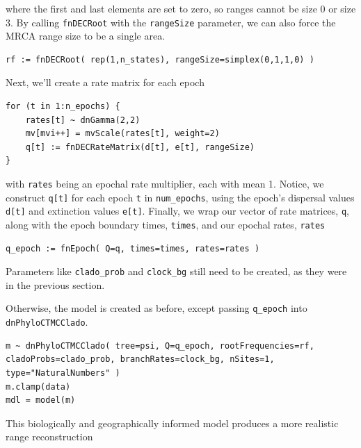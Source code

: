 where the first and last elements are set to zero, so ranges cannot be size 0 or size 3.
By calling {\tt fnDECRoot} with the {\tt rangeSize} parameter, we can also force the MRCA range size to be a single area.

\begin{snugshade}
\begin{lstlisting}
rf := fnDECRoot( rep(1,n_states), rangeSize=simplex(0,1,1,0) )
\end{lstlisting}
\end{snugshade}

Next, we'll create a rate matrix for each epoch

\begin{snugshade}
\begin{lstlisting}
for (t in 1:n_epochs) {
	rates[t] ~ dnGamma(2,2)
	mv[mvi++] = mvScale(rates[t], weight=2)	
	q[t] := fnDECRateMatrix(d[t], e[t], rangeSize)
}
\end{lstlisting}
\end{snugshade}

with {\tt rates} being an epochal rate multiplier, each with mean 1.
Notice, we construct {\tt q[t]} for each epoch {\tt t} in {\tt num\_epochs}, using the epoch's dispersal values {\tt d[t]} and extinction values {\tt e[t]}.
Finally, we wrap our vector of rate matrices, {\tt q}, along with the epoch boundary times, {\tt times}, and  our epochal rates, {\tt rates} 

\begin{snugshade}
\begin{lstlisting}
q_epoch := fnEpoch( Q=q, times=times, rates=rates )
\end{lstlisting}
\end{snugshade}

Parameters like {\tt clado\_prob} and {\tt clock\_bg} still need to be created, as they were in the previous section.

Otherwise, the model is created as before, except passing {\tt q\_epoch} into {\tt dnPhyloCTMCClado}.

\begin{snugshade}
\begin{lstlisting}
m ~ dnPhyloCTMCClado( tree=psi, Q=q_epoch, rootFrequencies=rf, cladoProbs=clado_prob, branchRates=clock_bg, nSites=1, type="NaturalNumbers" )
m.clamp(data)
mdl = model(m)
\end{lstlisting}
\end{snugshade}

This biologically and geographically informed model produces a more realistic range reconstruction

